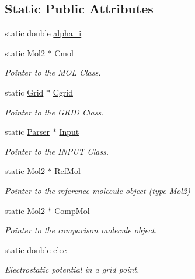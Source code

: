 \subsection*{Static Public Attributes}
\begin{DoxyCompactItemize}
\item 
static double \hyperlink{classMinimizer2_aa446d4997e158501ce036b559904952e}{alpha\_\-i}
\item 
static \hyperlink{classMol2}{Mol2} $\ast$ \hyperlink{classMinimizer2_af79d496194cba04903627d821f0faca3}{Cmol}
\begin{DoxyCompactList}\small\item\em Pointer to the MOL Class. \end{DoxyCompactList}\item 
static \hyperlink{classGrid}{Grid} $\ast$ \hyperlink{classMinimizer2_a82909d2dd56fc9747ae6edbe94b2e5d2}{Cgrid}
\begin{DoxyCompactList}\small\item\em Pointer to the GRID Class. \end{DoxyCompactList}\item 
static \hyperlink{classParser}{Parser} $\ast$ \hyperlink{classMinimizer2_a589bf24b76630588dbd93b78ed85deb4}{Input}
\begin{DoxyCompactList}\small\item\em Pointer to the INPUT Class. \end{DoxyCompactList}\item 
static \hyperlink{classMol2}{Mol2} $\ast$ \hyperlink{classMinimizer2_ac00d3a0aba2c77a4202fb647d3dbb561}{RefMol}
\begin{DoxyCompactList}\small\item\em Pointer to the reference molecule object (type \hyperlink{classMol2}{Mol2}) \end{DoxyCompactList}\item 
static \hyperlink{classMol2}{Mol2} $\ast$ \hyperlink{classMinimizer2_acb70dec810b27d78484566c87281ab26}{CompMol}
\begin{DoxyCompactList}\small\item\em Pointer to the comparison molecule object. \end{DoxyCompactList}\item 
static double \hyperlink{classMinimizer2_a98b7bf0f7dc850bc5ce22721d6a8caf2}{elec}
\begin{DoxyCompactList}\small\item\em Electrostatic potential in a grid point. \end{DoxyCompactList}\item 

\end{DoxyCompactItemize}
